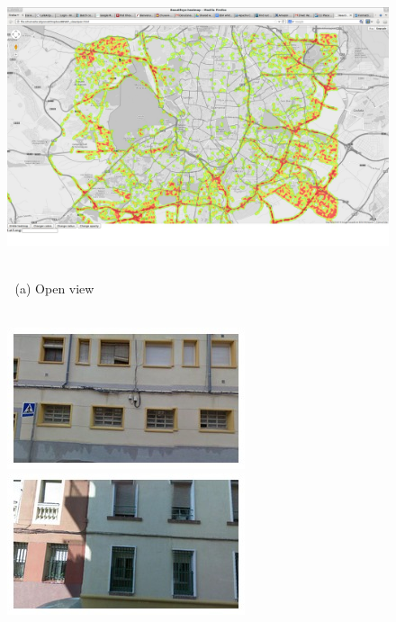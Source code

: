 \begin{figure}
\begin{minipage}{\linewidth}
\begin{minipage}{0.3\linewidth}
    \end{minipage}
    \begin{minipage}{0.7\linewidth}
      \includegraphics[trim= 350 150 250 150, clip=true, width=\linewidth]{imgs/view/mapV1.jpg}
    \end{minipage}
  \end{minipage}
  \\
  $\;$ \hspace{30mm} (a) Open view
  \\
  \\
  \begin{minipage}{\linewidth}
    \begin{minipage}{0.3\linewidth}
      \includegraphics[width=0.49\linewidth]{imgs/view/mosaicsV3/mosaic0000.jpg}
      \includegraphics[width=0.49\linewidth]{imgs/view/mosaicsV3/mosaic0001.jpg}
      \\ \vspace{-3mm} \\

\end{minipage}
\end{minipage}
\end{figure}
